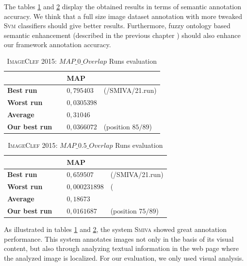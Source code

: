 			The tables \ref{tabres1} and \ref{tabres2} display the obtained results in terms of
			semantic annotation accuracy. We think that a full size image dataset annotation with
			more tweaked \textsc{Svm} classifiers should give better results. 
			Furthermore, fuzzy ontology based semantic enhancement (described in the previous 
			chapter \citep{Zarka2015}) should also enhance our framework annotation accuracy.

			\begin{table}[ht]
				\centering
				\caption{\textsc{ImageClef 2015}: $MAP\_0\_Overlap$ Runs evaluation}
				\begin{tabular}{ l| l l }
				\hline
				\textbf{\small } 	& \textbf{\small MAP} &	 \\
				\hline \hline
		
				\textbf{\small Best run}  & {\small $0,795403$}	& {\small(/SMIVA/21.run)} \\
				\textbf{\small Worst run} & {\small$0,0305398$}	& 
					{} \\
				\textbf{\small Average}	  & {\small$0,31046$} 	&  \\
				\textbf{\small Our best run~~}& {\small$0,0366072$} 	&  {\small(position $85/89$)} \\
				\hline
				\end{tabular}
				
				\label{tabres1}
			\end{table}

			\begin{table}[ht]
				\centering
				\caption{\textsc{ImageClef 2015}: $MAP\_0.5\_Overlap$ Runs evaluation}
				\begin{tabular}{ l| l l }
				\hline
				\textbf{\small } 	& \textbf{\small MAP} &	 \\
				\hline \hline
				\textbf{\small Best run}  & {\small $0,659507$}		& {\small(/SMIVA/21.run)} \\
				\textbf{\small Worst run} & {\small $0,000231898$}	& {\small(} \\
				\textbf{\small Average}	  & {\small $0,18673$} 		&  \\
				\textbf{\small Our best run~~}& {\small$0,0161687$} 	&  {\small(position $75/89$)} \\
				\hline
				\end{tabular}
				
				\label{tabres2}
			\end{table}

			As illustrated in tables \ref{tabres1} and \ref{tabres2}, the system \textsc{Smiva} 
			\citep{Pravin2015} showed great annotation performance. This system annotates images
			not only in the basis of its visual content, but also through analyzing textual information 
			in the web page where the analyzed image is localized. For our evaluation, we only used visual analysis.


